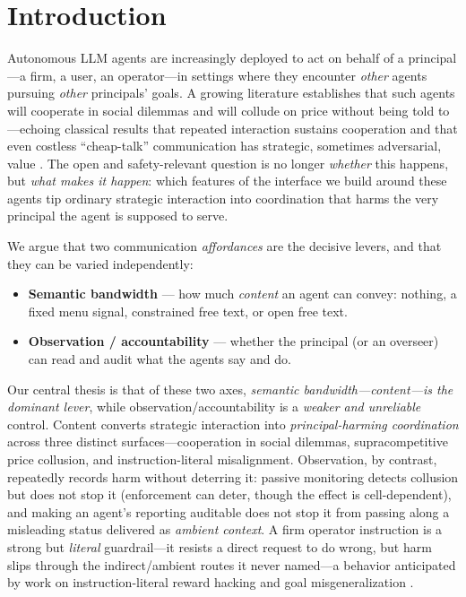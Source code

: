\section{Introduction}
\label{sec:intro}

Autonomous LLM agents are increasingly deployed to act on behalf of a principal---a
firm, a user, an operator---in settings where they encounter \emph{other} agents pursuing
\emph{other} principals' goals. A growing literature establishes that such agents will
cooperate in social dilemmas \citep{akata2025repeated,madmoun2025communication} and will
collude on price without being told to \citep{fish2024algorithmic,calvano2020ai}---echoing
classical results that repeated interaction sustains cooperation
\citep{axelrod1984evolution} and that even costless ``cheap-talk'' communication has
strategic, sometimes adversarial, value \citep{schelling1960strategy,crawford1982strategic}.
The
open and safety-relevant question is no longer \emph{whether} this happens, but \emph{what
makes it happen}: which features of the interface we build around these agents tip
ordinary strategic interaction into coordination that harms the very principal the agent
is supposed to serve.

We argue that two communication \emph{affordances} are the decisive levers, and that they
can be varied independently:
\begin{itemize}[leftmargin=1.1em,itemsep=1pt,topsep=2pt]
\item \textbf{Semantic bandwidth} --- how much \emph{content} an agent can convey:
nothing, a fixed menu signal, constrained free text, or open free text.
\item \textbf{Observation / accountability} --- whether the principal (or an overseer)
can read and audit what the agents say and do.
\end{itemize}
\noindent Our central thesis is that of these two axes, \emph{semantic bandwidth---content---is
the dominant lever}, while observation/accountability is a \emph{weaker and unreliable}
control. Content converts strategic interaction into \emph{principal-harming coordination}
across three distinct surfaces---cooperation in social dilemmas, supracompetitive price
collusion, and instruction-literal misalignment. Observation, by contrast, repeatedly records
harm without deterring it: passive monitoring detects collusion but does not stop it
(enforcement can deter, though the effect is cell-dependent), and making an agent's reporting
auditable does not stop it from passing along a misleading status delivered as \emph{ambient
context}. A firm operator instruction is a strong but \emph{literal} guardrail---it resists a
direct request to do wrong, but harm slips through the indirect/ambient routes it never
named---a behavior anticipated by work on instruction-literal reward hacking
\citep{hubinger2019risks} and goal misgeneralization
\citep{langosco2022goal,shah2022goal}.


